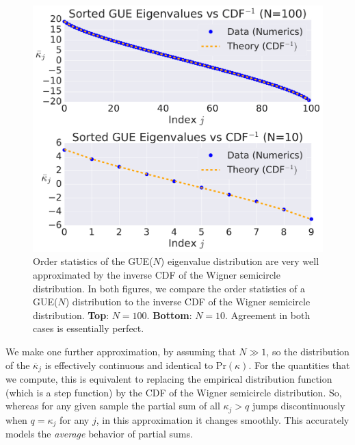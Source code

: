 \documentclass[aps,pra, twocolumn]{revtex4-1}
\begin{document}
\begin{figure}[h!]
\includegraphics[width=\columnwidth]{Images/Figure_5.pdf}
\caption{Order statistics of the GUE($N$) eigenvalue distribution are very well approximated by the inverse CDF of the Wigner semicircle distribution.  In both figures, we compare the order statistics of a GUE($N$) distribution to the inverse CDF of the Wigner semicircle distribution. \textbf{Top}:  $N=100$.  \textbf{Bottom}:  $N=10$.
Agreement in both cases is essentially perfect.}
\label{fig:orderstatistics2}
\end{figure}

We make one further approximation, by assuming that $N\gg1$, so the distribution of the $\overline{\kappa}_j$ is effectively continuous and identical to $\mathrm{Pr}(\kappa)$. For the quantities that we compute, this is equivalent to replacing the empirical distribution function (which is a step function) by the CDF of the Wigner semicircle distribution.  So, whereas for any given sample the partial sum of all $\kappa_j > q$ jumps discontinuously when $q=\kappa_j$ for any $j$, in this approximation it changes smoothly.  This accurately models the \emph{average} behavior of partial sums.
\end{document}
